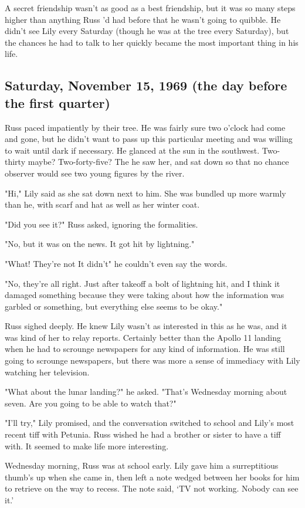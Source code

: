 A secret friendship wasn't as good as a best friendship, but it was so many steps higher than anything Russ 'd had before that he wasn't going to quibble. He didn't see Lily every Saturday (though he was at the tree every Saturday), but the chances he had to talk to her quickly became the most important thing in his life.

\subsection{Saturday, November 15, 1969 (the day before the first quarter)}

Russ paced impatiently by their tree. He was fairly sure two o'clock had come and gone, but he didn't want to pass up this particular meeting and was willing to wait until dark if necessary. He glanced at the sun in the southwest. Two-thirty maybe? Two-forty-five? The he saw her, and sat down so that no chance observer would see two young figures by the river.

"Hi," Lily said as she sat down next to him. She was bundled up more warmly than he, with scarf and hat as well as her winter coat.

"Did you see it?" Russ asked, ignoring the formalities.

"No, but it was on the news. It got hit by lightning."

"What! They're not{\el} It didn't{\el}" he couldn't even say the words.

"No, they're all right. Just after takeoff a bolt of lightning hit, and I think it damaged something because they were taking about how the information was garbled or something, but everything else seems to be okay."

Russ sighed deeply. He knew Lily wasn't as interested in this as he was, and it was kind of her to relay reports. Certainly better than the Apollo 11 landing when he had to scrounge newspapers for any kind of information. He was still going to scrounge newspapers, but there was more a sense of immediacy with Lily watching her television.

"What about the lunar landing?" he asked. "That's{\el} Wednesday morning about seven. Are you going to be able to{\el} watch that?"

"I'll try," Lily promised, and the conversation switched to school and Lily's most recent tiff with Petunia. Russ wished he had a brother or sister to have a tiff with. It seemed to make life more interesting.

Wednesday morning, Russ was at school early. Lily gave him a surreptitious thumb's up when she came in, then left a note wedged between her books for him to retrieve on the way to recess. The note said, `TV not working. Nobody can see it.'

